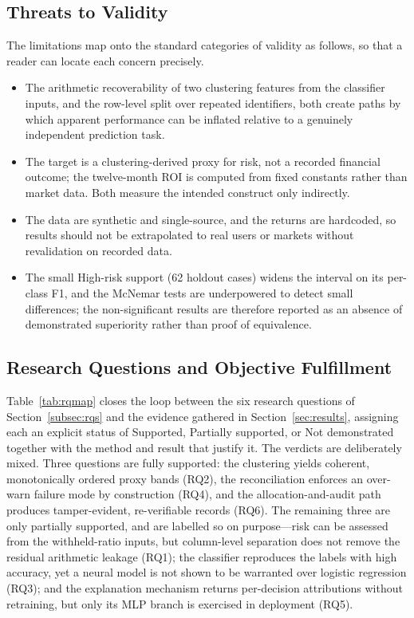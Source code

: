 \subsection{Threats to Validity}\label{subsec:threats}
The limitations map onto the standard categories of validity as follows, so that a reader
can locate each concern precisely.

\begin{itemize}
\item[\textbf{Internal.}] The arithmetic recoverability of two clustering features from the
  classifier inputs, and the row-level split over repeated identifiers, both create paths
  by which apparent performance can be inflated relative to a genuinely independent
  prediction task.
\item[\textbf{Construct.}] The target is a clustering-derived proxy for risk, not a
  recorded financial outcome; the twelve-month ROI is computed from fixed constants rather
  than market data. Both measure the intended construct only indirectly.
\item[\textbf{External.}] The data are synthetic and single-source, and the returns are
  hardcoded, so results should not be extrapolated to real users or markets without
  revalidation on recorded data.
\item[\textbf{Conclusion.}] The small High-risk support (62 holdout cases) widens the
  interval on its per-class F1, and the McNemar tests are underpowered to detect small
  differences; the non-significant results are therefore reported as an absence of
  demonstrated superiority rather than proof of equivalence.
\end{itemize}

\subsection{Research Questions and Objective Fulfillment}\label{subsec:rq-fulfillment}
Table~\ref{tab:rqmap} closes the loop between the six research questions of
Section~\ref{subsec:rqs} and the evidence gathered in Section~\ref{sec:results}, assigning
each an explicit status of Supported, Partially supported, or Not demonstrated together
with the method and result that justify it. The verdicts are deliberately mixed. Three
questions are fully supported: the clustering yields coherent, monotonically ordered proxy
bands (RQ2), the reconciliation enforces an over-warn failure mode by construction (RQ4),
and the allocation-and-audit path produces tamper-evident, re-verifiable records (RQ6). The
remaining three are only partially supported, and are labelled so on purpose---risk can be
assessed from the withheld-ratio inputs, but column-level separation does not remove the
residual arithmetic leakage (RQ1); the classifier reproduces the labels with high accuracy,
yet a neural model is not shown to be warranted over logistic regression (RQ3); and the
explanation mechanism returns per-decision attributions without retraining, but only its
MLP branch is exercised in deployment (RQ5).

